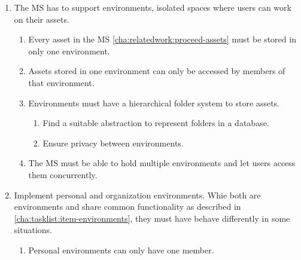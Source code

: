 \begin{enumerate}
	\item The MS has to support environments, isolated spaces where users can work on their
	      assets. \label{cha:tasklist:item-environments}
	      \begin{enumerate}
		      \item Every asset in the MS \ref{cha:relatedwork:proceed-assets} must be stored in only one environment.

		      \item Assets stored in one environment can only be accessed by members of that
		            environment.

		      \item Environments must have a hierarchical folder system to store assets.
		            \begin{enumerate}
			            \item Find a suitable abstraction to represent folders in a database.

			            \item Ensure privacy between environments.


		            \end{enumerate}

		      \item The MS must be able to hold multiple environments and let users access them concurrently.

	      \end{enumerate}

	\item Implement personal and organization environments. Whie both are environments
	      and share common functionality as described in
	      \ref{cha:tasklist:item-environments}, they must have behave differently in some
	      situations.
	      \begin{enumerate}
		      \item Personal environments can only have one member.


\end{enumerate}
\end{enumerate}
